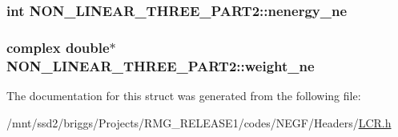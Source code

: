 \hypertarget{struct_n_o_n___l_i_n_e_a_r___t_h_r_e_e___p_a_r_t2_af1954d128a60c9389fb2c0f53439afee}{
\subsubsection[{nenergy\-\_\-ne}]{\setlength{\rightskip}{0pt plus 5cm}int N\-O\-N\-\_\-\-L\-I\-N\-E\-A\-R\-\_\-\-T\-H\-R\-E\-E\-\_\-\-P\-A\-R\-T2\-::nenergy\-\_\-ne}}\label{struct_n_o_n___l_i_n_e_a_r___t_h_r_e_e___p_a_r_t2_af1954d128a60c9389fb2c0f53439afee}
\hypertarget{struct_n_o_n___l_i_n_e_a_r___t_h_r_e_e___p_a_r_t2_afc7255e08ced14f92e07173a88f7aee6}{
\subsubsection[{weight\-\_\-ne}]{\setlength{\rightskip}{0pt plus 5cm}complex double$\ast$ N\-O\-N\-\_\-\-L\-I\-N\-E\-A\-R\-\_\-\-T\-H\-R\-E\-E\-\_\-\-P\-A\-R\-T2\-::weight\-\_\-ne}}\label{struct_n_o_n___l_i_n_e_a_r___t_h_r_e_e___p_a_r_t2_afc7255e08ced14f92e07173a88f7aee6}


The documentation for this struct was generated from the following file\-:\begin{DoxyCompactItemize}
\item 
/mnt/ssd2/briggs/\-Projects/\-R\-M\-G\-\_\-\-R\-E\-L\-E\-A\-S\-E1/codes/\-N\-E\-G\-F/\-Headers/\hyperlink{_l_c_r_8h}{L\-C\-R.\-h}\end{DoxyCompactItemize}
